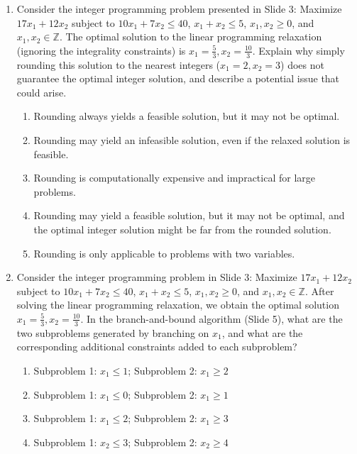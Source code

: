 \documentclass{article}%
\begin{document}
\begin{enumerate}
\begin{enumerate}
\item The alternative systems are only applicable to systems with equality constraints.%
\end{enumerate}%
\vspace{1em}%
\item Consider the integer programming problem presented in Slide 3: Maximize $17x_1 + 12x_2$ subject to $10x_1 + 7x_2 \le 40$, $x_1 + x_2 \le 5$, $x_1, x_2 \ge 0$, and $x_1, x_2 \in \mathbb{Z}$.  The optimal solution to the linear programming relaxation (ignoring the integrality constraints) is $x_1 = \frac{5}{3}, x_2 = \frac{10}{3}$.  Explain why simply rounding this solution to the nearest integers ($x_1 = 2, x_2 = 3$) does not guarantee the optimal integer solution, and describe a potential issue that could arise.%
\begin{enumerate}%
\item Rounding always yields a feasible solution, but it may not be optimal.%
\item Rounding may yield an infeasible solution, even if the relaxed solution is feasible.%
\item Rounding is computationally expensive and impractical for large problems.%
\item Rounding may yield a feasible solution, but it may not be optimal, and the optimal integer solution might be far from the rounded solution.%
\item Rounding is only applicable to problems with two variables.%
\end{enumerate}%
\vspace{1em}%
\item Consider the integer programming problem in Slide 3: Maximize $17x_1 + 12x_2$ subject to $10x_1 + 7x_2 \le 40$, $x_1 + x_2 \le 5$, $x_1, x_2 \ge 0$, and $x_1, x_2 \in \mathbb{Z}$.  After solving the linear programming relaxation, we obtain the optimal solution $x_1 = \frac{5}{3}, x_2 = \frac{10}{3}$.  In the branch-and-bound algorithm (Slide 5), what are the two subproblems generated by branching on $x_1$, and what are the corresponding additional constraints added to each subproblem?%
\begin{enumerate}%
\item Subproblem 1: $x_1 \le 1$; Subproblem 2: $x_1 \ge 2$%
\item Subproblem 1: $x_1 \le 0$; Subproblem 2: $x_1 \ge 1$%
\item Subproblem 1: $x_1 \le 2$; Subproblem 2: $x_1 \ge 3$%
\item Subproblem 1: $x_2 \le 3$; Subproblem 2: $x_2 \ge 4$%

\end{enumerate}
\end{enumerate}
\end{document}
